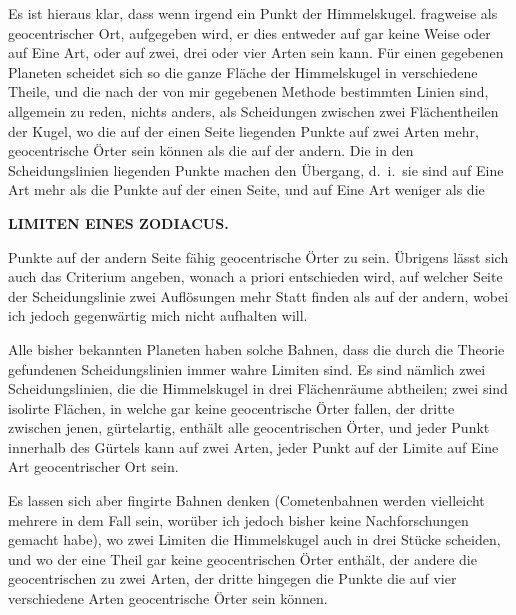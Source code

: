 Es ist hieraus klar, dass wenn irgend ein Punkt der Himmelskugel. fragweise als geocentrischer Ort, aufgegeben wird, er dies entweder auf gar keine Weise oder auf Eine Art, oder auf zwei, drei oder vier Arten sein kann. Für einen gegebenen Planeten scheidet sich so die ganze Fläche der Himmelskugel in verschiedene Theile, und die nach der von mir gegebenen Methode bestimmten Linien sind, allgemein zu reden, nichts anders, als Scheidungen zwischen zwei Flächentheilen der Kugel, wo die auf der einen Seite liegenden Punkte auf zwei Arten mehr, geocentrische Örter sein können als die auf der andern. Die in den Scheidungslinien liegenden Punkte machen den Übergang, d.\ i.\ sie sind auf Eine Art mehr als die Punkte auf der einen Seite, und auf Eine Art weniger als die
\par\nobreak\smallskip\noindent\makebox[.84\linewidth][r]{{\normalsize\bfseries 25\textsuperscript{*}}}\par
\clearpage
\thispagestyle{empty}
\noindent{}%
%
\parbox[t]{\dimexpr\linewidth-24mm\relax}{\centering\footnotesize\bfseries LIMITEN EINES ZODIACUS.\par}%
\makebox[12mm][r]{}\par\nobreak\medskip
\noindent Punkte auf der andern Seite fähig geocentrische Örter zu sein. Übrigens lässt sich auch das Criterium angeben, wonach a priori entschieden wird, auf welcher Seite der Scheidungslinie zwei Auflösungen mehr Statt finden als auf der andern, wobei ich jedoch gegenwärtig mich nicht aufhalten will.

Alle bisher bekannten Planeten haben solche Bahnen, dass die durch die Theorie gefundenen Scheidungslinien immer wahre Limiten sind. Es sind nämlich zwei Scheidungslinien, die die Himmelskugel in drei Flächenräume abtheilen; zwei sind isolirte Flächen, in welche gar keine geocentrische Örter fallen, der dritte zwischen jenen, gürtelartig, enthält alle geocentrischen Örter, und jeder Punkt innerhalb des Gürtels kann auf zwei Arten, jeder Punkt auf der Limite auf Eine Art geocentrischer Ort sein.

Es lassen sich aber fingirte Bahnen denken (Cometenbahnen werden vielleicht mehrere in dem Fall sein, worüber ich jedoch bisher keine Nachforschungen gemacht habe), wo zwei Limiten die Himmelskugel auch in drei Stücke scheiden, und wo der eine Theil gar keine geocentrischen Örter enthält, der andere die geocentrischen zu zwei Arten, der dritte hingegen die Punkte die auf vier verschiedene Arten geocentrische Örter sein können.

